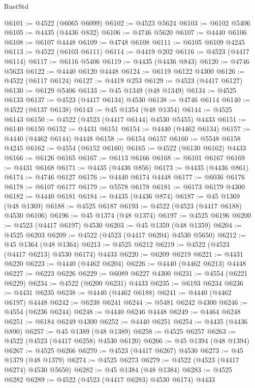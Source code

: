 \begin{lexlean}{RustStd}
\begin{coremodule}
@6101 := @4522 (@6065 @6099)
@6102 := @4523 @5624
@6103 := @6102 @5406
@6105 := @4435 (@4436 @832)
@6106 := @4746 @5620
@6107 := @4440 @6106
@6108 := @6107 @4448
@6109 := @4748 @6108
@6111 := @6105 @6109 @4245
@6113 := @4522 (@6103 @6111)
@6114 := @4419 @202
@6116 := @4523 (@4417 @6114)
@6117 := @6116 @5406
@6119 := @4435 (@4436 @843)
@6120 := @4746 @5623
@6122 := @4440 @6120 @4448
@6124 := @6119 @6122 @4300
@6126 := @4522 (@6117 @6124)
@6127 := @4419 @253
@6129 := @4523 (@4417 @6127)
@6130 := @6129 @5406
@6133 := @45 @1349 (@48 @1349)
@6134 := @4525 @6133
@6137 := @4523 (@4417 @6134) @4530
@6138 := @4746 @6114
@6140 := @4522 (@6137 @6138)
@6143 := @45 @1354 (@48 @1354)
@6144 := @4525 @6143
@6150 := @4522 (@4523 (@4417 @6144) @4530 @5455) @4433
@6151 := @6140 @6150
@6152 := @4431 @6151
@6154 := @4440 (@4462 @6134)
@6157 := @4440 (@4462 @6144) @4448
@6158 := @6154 @6157
@6160 := @5548 @6158 @4245
@6162 := @4554 (@6152 @6160)
@6165 := @4522 (@6130 @6162) @4433
@6166 := @6126 @6165
@6167 := @6113 @6166
@6168 := @6101 @6167
@6169 := @4431 @6168
@6171 := @4435 (@4436 @856)
@6173 := @4435 (@4436 @861)
@6174 := @4746 @6127
@6176 := @4440 @6174 @4448
@6177 := @6036 @6176
@6178 := @6107 @6177
@6179 := @5578 @6178
@6181 := @6173 @6179 @4300
@6182 := @4440 @6181
@6184 := @4435 (@4436 @874)
@6187 := @45 @1369 (@48 @1369)
@6188 := @4525 @6187
@6193 := @4522 (@4523 (@4417 @6188) @4530 @6106)
@6196 := @45 @1374 (@48 @1374)
@6197 := @4525 @6196
@6200 := @4523 (@4417 @6197) @4530
@6203 := @45 @1359 (@48 @1359)
@6204 := @4525 @6203
@6209 := @4522 (@4523 (@4417 @6204) @4530 @5650)
@6212 := @45 @1364 (@48 @1364)
@6213 := @4525 @6212
@6219 := @4522 (@4523 (@4417 @6213) @4530 @6174) @4433
@6220 := @6209 @6219
@6221 := @4431 @6220
@6223 := @4440 (@4462 @6204)
@6226 := @4440 (@4462 @6213) @4448
@6227 := @6223 @6226
@6229 := @6089 @6227 @4300
@6231 := @4554 (@6221 @6229)
@6234 := @4522 (@6200 @6231) @4433
@6235 := @6193 @6234
@6236 := @4431 @6235
@6238 := @4440 (@4462 @6188)
@6241 := @4440 (@4462 @6197) @4448
@6242 := @6238 @6241
@6244 := @5481 @6242 @4300
@6246 := @4554 (@6236 @6244)
@6248 := @4440 @6246 @4448
@6249 := @4464 @6248
@6251 := @6184 @6249 @4300
@6252 := @4440 @6251
@6254 := @4435 (@4436 @890)
@6257 := @45 @1389 (@48 @1389)
@6258 := @4525 @6257
@6263 := @4522 (@4523 (@4417 @6258) @4530 @6120)
@6266 := @45 @1394 (@48 @1394)
@6267 := @4525 @6266
@6270 := @4523 (@4417 @6267) @4530
@6273 := @45 @1379 (@48 @1379)
@6274 := @4525 @6273
@6279 := @4522 (@4523 (@4417 @6274) @4530 @5650)
@6282 := @45 @1384 (@48 @1384)
@6283 := @4525 @6282
@6289 := @4522 (@4523 (@4417 @6283) @4530 @6174) @4433

\end{coremodule}
\end{lexlean}
